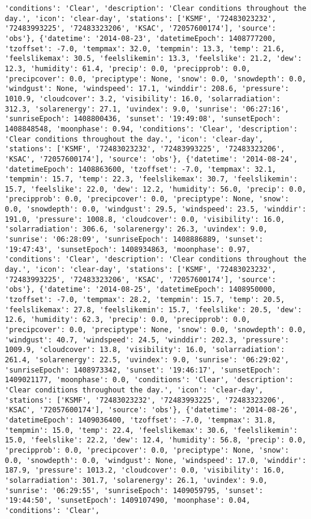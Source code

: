 \documentclass[
  letterpaper,
  DIV=11,
  numbers=noendperiod]{scrartcl}
\begin{document}
\begin{verbatim}
'conditions': 'Clear', 'description': 'Clear conditions throughout the day.', 'icon': 'clear-day', 'stations': ['KSMF', '72483023232', '72483993225', '72483323206', 'KSAC', '72057600174'], 'source': 'obs'}, {'datetime': '2014-08-23', 'datetimeEpoch': 1408777200, 'tzoffset': -7.0, 'tempmax': 32.0, 'tempmin': 13.3, 'temp': 21.6, 'feelslikemax': 30.5, 'feelslikemin': 13.3, 'feelslike': 21.2, 'dew': 12.3, 'humidity': 61.4, 'precip': 0.0, 'precipprob': 0.0, 'precipcover': 0.0, 'preciptype': None, 'snow': 0.0, 'snowdepth': 0.0, 'windgust': None, 'windspeed': 17.1, 'winddir': 208.6, 'pressure': 1010.9, 'cloudcover': 3.2, 'visibility': 16.0, 'solarradiation': 312.3, 'solarenergy': 27.1, 'uvindex': 9.0, 'sunrise': '06:27:16', 'sunriseEpoch': 1408800436, 'sunset': '19:49:08', 'sunsetEpoch': 1408848548, 'moonphase': 0.94, 'conditions': 'Clear', 'description': 'Clear conditions throughout the day.', 'icon': 'clear-day', 'stations': ['KSMF', '72483023232', '72483993225', '72483323206', 'KSAC', '72057600174'], 'source': 'obs'}, {'datetime': '2014-08-24', 'datetimeEpoch': 1408863600, 'tzoffset': -7.0, 'tempmax': 32.1, 'tempmin': 15.7, 'temp': 22.3, 'feelslikemax': 30.7, 'feelslikemin': 15.7, 'feelslike': 22.0, 'dew': 12.2, 'humidity': 56.0, 'precip': 0.0, 'precipprob': 0.0, 'precipcover': 0.0, 'preciptype': None, 'snow': 0.0, 'snowdepth': 0.0, 'windgust': 29.5, 'windspeed': 23.5, 'winddir': 191.0, 'pressure': 1008.8, 'cloudcover': 0.0, 'visibility': 16.0, 'solarradiation': 306.6, 'solarenergy': 26.3, 'uvindex': 9.0, 'sunrise': '06:28:09', 'sunriseEpoch': 1408886889, 'sunset': '19:47:43', 'sunsetEpoch': 1408934863, 'moonphase': 0.97, 'conditions': 'Clear', 'description': 'Clear conditions throughout the day.', 'icon': 'clear-day', 'stations': ['KSMF', '72483023232', '72483993225', '72483323206', 'KSAC', '72057600174'], 'source': 'obs'}, {'datetime': '2014-08-25', 'datetimeEpoch': 1408950000, 'tzoffset': -7.0, 'tempmax': 28.2, 'tempmin': 15.7, 'temp': 20.5, 'feelslikemax': 27.8, 'feelslikemin': 15.7, 'feelslike': 20.5, 'dew': 12.6, 'humidity': 62.3, 'precip': 0.0, 'precipprob': 0.0, 'precipcover': 0.0, 'preciptype': None, 'snow': 0.0, 'snowdepth': 0.0, 'windgust': 40.7, 'windspeed': 24.5, 'winddir': 202.3, 'pressure': 1009.9, 'cloudcover': 13.8, 'visibility': 16.0, 'solarradiation': 261.4, 'solarenergy': 22.5, 'uvindex': 9.0, 'sunrise': '06:29:02', 'sunriseEpoch': 1408973342, 'sunset': '19:46:17', 'sunsetEpoch': 1409021177, 'moonphase': 0.0, 'conditions': 'Clear', 'description': 'Clear conditions throughout the day.', 'icon': 'clear-day', 'stations': ['KSMF', '72483023232', '72483993225', '72483323206', 'KSAC', '72057600174'], 'source': 'obs'}, {'datetime': '2014-08-26', 'datetimeEpoch': 1409036400, 'tzoffset': -7.0, 'tempmax': 31.8, 'tempmin': 15.0, 'temp': 22.4, 'feelslikemax': 30.6, 'feelslikemin': 15.0, 'feelslike': 22.2, 'dew': 12.4, 'humidity': 56.8, 'precip': 0.0, 'precipprob': 0.0, 'precipcover': 0.0, 'preciptype': None, 'snow': 0.0, 'snowdepth': 0.0, 'windgust': None, 'windspeed': 17.0, 'winddir': 187.9, 'pressure': 1013.2, 'cloudcover': 0.0, 'visibility': 16.0, 'solarradiation': 301.7, 'solarenergy': 26.1, 'uvindex': 9.0, 'sunrise': '06:29:55', 'sunriseEpoch': 1409059795, 'sunset': '19:44:50', 'sunsetEpoch': 1409107490, 'moonphase': 0.04, 'conditions': 'Clear', 
\end{verbatim}
\end{document}
